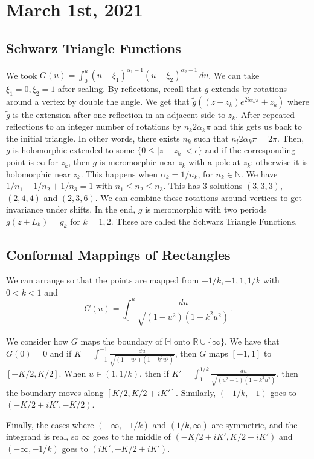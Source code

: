 \documentclass[12pt]{scrartcl}
\newcommand{\N}{\mathbb{N}}
\newcommand{\R}{\mathbb{R}}
\renewcommand{\tilde}{\widetilde}
\begin{document}
\section{March 1st, 2021}
\subsection{Schwarz Triangle Functions}
We took $G(u) = \int_0^u (u - \xi_1)^{\alpha_1 - 1}(u - \xi_2)^{\alpha_2 - 1}\,du$.  We can take $\xi_1 = 0, \xi_2 = 1$ after scaling.  By reflections, recall that $g$ extends by rotations around a vertex by double the angle.  We get that $\tilde g((z - z_k)e^{2 i \alpha_k \pi} + z_k)$ where $\tilde{g}$ is the extension after one reflection in an adjacent side to $z_k$.  After repeated reflections to an integer number of rotations by $n_k 2 \alpha_k \pi$ and this gets us back to the initial triangle.    In other words, there exists $n_k$ such that $n_l 2\alpha_k \pi = 2\pi$.  Then, $g$ is holomorphic extended to some $\{0 \le |z - z_k| < \epsilon\}$ and if the corresponding point is $\infty$ for $z_k$, then $g$ is meromorphic near $z_k$ with a pole at $z_k$; otherwise it is holomorphic near $z_k$. This happens when $\alpha_k = 1/n_k$, for $n_k \in \N$.  We have $1/n_1 + 1/n_2 + 1/n_3 = 1$ with $n_1 \le n_2 \le n_3$.  This has $3$ solutions $(3 ,3, 3)$, $(2, 4, 4)$ and $(2, 3, 6)$.  We can combine these rotations around vertices to get invariance under shifts.  In the end, $g$ is meromorphic with two periods $g(z + L_k) = g_k$ for $k = 1, 2$.  These are called the Schwarz Triangle Functions.  

\subsection{Conformal Mappings of Rectangles}
We can arrange so that the points are mapped from $-1/k , -1, 1, 1/k$ with $0 < k < 1$ and 
$$G(u) = \int_0^u \frac{du}{\sqrt{(1 - u^2)(1 - k^2 u^2)}}.$$

We consider how $G$ maps the boundary of $\mathbb H$ onto $\R \cup \{\infty\}$.    We have that $G(0) = 0$ and if $K = \int_{-1}^{-1} \frac{du}{\sqrt{(1 - u^2)(1 - k^2 u ^2)}}$, then $G$ maps $[-1, 1]$ to $[-K/2, K/2]$.
When $u \in (1, 1/k)$, then if $K' = \int_1^{1/k}\frac{du}{\sqrt{(u^2 - 1)(1 - k^2 u^2)}}$, then the boundary moves along $[K/2, K/2 + iK']$.  Similarly, $(-1/k, -1)$ goes to $(-K/2 +  iK', -K/2)$.  

Finally, the cases where $(-\infty, -1/k)$ and $(1/k, \infty)$ are symmetric, and the integrand is real, so $\infty$ goes to the middle of $(-K/2 + iK', K/2 + iK')$ and $(-\infty, -1/k)$ goes to $(iK', -K/2 + iK')$.
\end{document}
